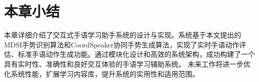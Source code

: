     
    

    
\section{本章小结}
本章详细介绍了交互式手语学习助手系统的设计与实现。系统基于本文提出的MDSI手势识别算法和CoordSpeaker协同手势生成算法，实现了实时手语动作评估、标准手语动作生成功能。通过模块化设计和高效的系统架构，成功构建了一个具有实时性、准确性和良好交互体验的手语学习辅助系统。%
未来工作将进一步优化系统性能，扩展学习内容库，提升系统的实用性和适用范围。




